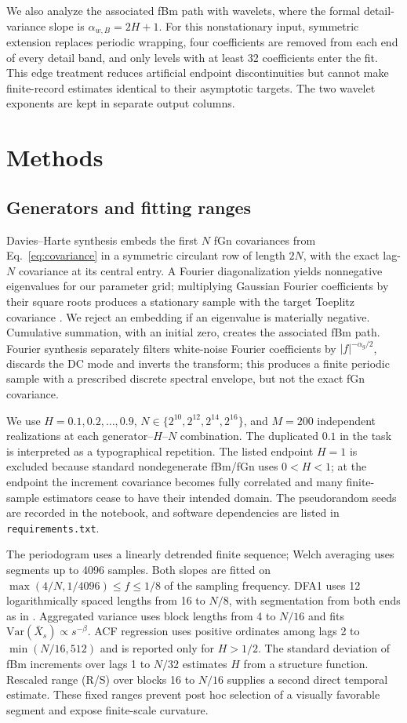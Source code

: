 \documentclass[12pt,twocolumn]{article}
\begin{document}
We also analyze the associated fBm path with wavelets, where the formal detail-variance slope is $\alpha_{w,B}=2H+1$. For this nonstationary input, symmetric extension replaces periodic wrapping, four coefficients are removed from each end of every detail band, and only levels with at least 32 coefficients enter the fit. This edge treatment reduces artificial endpoint discontinuities but cannot make finite-record estimates identical to their asymptotic targets. The two wavelet exponents are kept in separate output columns.

\section{Methods}
\subsection{Generators and fitting ranges}

Davies--Harte synthesis embeds the first $N$ fGn covariances from Eq.~\eqref{eq:covariance} in a symmetric circulant row of length $2N$, with the exact lag-$N$ covariance at its central entry. A Fourier diagonalization yields nonnegative eigenvalues for our parameter grid; multiplying Gaussian Fourier coefficients by their square roots produces a stationary sample with the target Toeplitz covariance \cite{davies1987,wood1994}. We reject an embedding if an eigenvalue is materially negative. Cumulative summation, with an initial zero, creates the associated fBm path. Fourier synthesis separately filters white-noise Fourier coefficients by $|f|^{-\alpha_g/2}$, discards the DC mode and inverts the transform; this produces a finite periodic sample with a prescribed discrete spectral envelope, but not the exact fGn covariance.

We use $H=0.1,0.2,\ldots,0.9$, $N\in\{2^{10},2^{12},2^{14},2^{16}\}$, and $M=200$ independent realizations at each generator--$H$--$N$ combination. The duplicated $0.1$ in the task is interpreted as a typographical repetition. The listed endpoint $H=1$ is excluded because standard nondegenerate fBm/fGn uses $0<H<1$; at the endpoint the increment covariance becomes fully correlated and many finite-sample estimators cease to have their intended domain. The pseudorandom seeds are recorded in the notebook, and software dependencies are listed in \texttt{requirements.txt}.

The periodogram uses a linearly detrended finite sequence; Welch averaging uses segments up to 4096 samples. Both slopes are fitted on $\max(4/N,1/4096)\le f\le1/8$ of the sampling frequency. DFA1 uses 12 logarithmically spaced lengths from 16 to $N/8$, with segmentation from both ends as in \cite{kantelhardt2002}. Aggregated variance uses block lengths from 4 to $N/16$ and fits $\mathrm{Var}(\bar X_s)\propto s^{-\beta}$. ACF regression uses positive ordinates among lags 2 to $\min(N/16,512)$ and is reported only for $H>1/2$. The standard deviation of fBm increments over lags 1 to $N/32$ estimates $H$ from a structure function. Rescaled range (R/S) over blocks 16 to $N/16$ supplies a second direct temporal estimate. These fixed ranges prevent post hoc selection of a visually favorable segment and expose finite-scale curvature.
\end{document}
